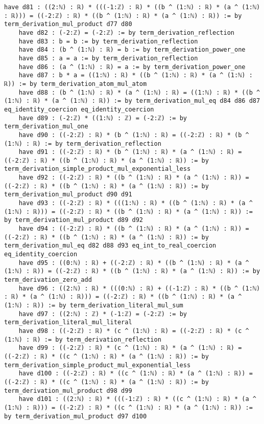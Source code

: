 \documentclass{article}
\begin{document}
\begin{tcolorbox}[colback=white!10, width=\linewidth]
\begin{lstlisting}[language=Lean4]
    have d81 : ((2:ℕ) : ℝ) * (((-1:ℤ) : ℝ) * ((b ^ (1:ℕ) : ℝ) * (a ^ (1:ℕ) : ℝ))) = ((-2:ℤ) : ℝ) * ((b ^ (1:ℕ) : ℝ) * (a ^ (1:ℕ) : ℝ)) := by term_derivation_mul_product d77 d80
    have d82 : (-2:ℤ) = (-2:ℤ) := by term_derivation_reflection
    have d83 : b = b := by term_derivation_reflection
    have d84 : (b ^ (1:ℕ) : ℝ) = b := by term_derivation_power_one
    have d85 : a = a := by term_derivation_reflection
    have d86 : (a ^ (1:ℕ) : ℝ) = a := by term_derivation_power_one
    have d87 : b * a = ((1:ℕ) : ℝ) * ((b ^ (1:ℕ) : ℝ) * (a ^ (1:ℕ) : ℝ)) := by term_derivation_atom_mul_atom
    have d88 : (b ^ (1:ℕ) : ℝ) * (a ^ (1:ℕ) : ℝ) = ((1:ℕ) : ℝ) * ((b ^ (1:ℕ) : ℝ) * (a ^ (1:ℕ) : ℝ)) := by term_derivation_mul_eq d84 d86 d87 eq_identity_coercion eq_identity_coercion
    have d89 : (-2:ℤ) * ((1:ℕ) : ℤ) = (-2:ℤ) := by term_derivation_mul_one
    have d90 : ((-2:ℤ) : ℝ) * (b ^ (1:ℕ) : ℝ) = ((-2:ℤ) : ℝ) * (b ^ (1:ℕ) : ℝ) := by term_derivation_reflection
    have d91 : ((-2:ℤ) : ℝ) * (b ^ (1:ℕ) : ℝ) * (a ^ (1:ℕ) : ℝ) = ((-2:ℤ) : ℝ) * ((b ^ (1:ℕ) : ℝ) * (a ^ (1:ℕ) : ℝ)) := by term_derivation_simple_product_mul_exponential_less
    have d92 : ((-2:ℤ) : ℝ) * ((b ^ (1:ℕ) : ℝ) * (a ^ (1:ℕ) : ℝ)) = ((-2:ℤ) : ℝ) * ((b ^ (1:ℕ) : ℝ) * (a ^ (1:ℕ) : ℝ)) := by term_derivation_mul_product d90 d91
    have d93 : ((-2:ℤ) : ℝ) * (((1:ℕ) : ℝ) * ((b ^ (1:ℕ) : ℝ) * (a ^ (1:ℕ) : ℝ))) = ((-2:ℤ) : ℝ) * ((b ^ (1:ℕ) : ℝ) * (a ^ (1:ℕ) : ℝ)) := by term_derivation_mul_product d89 d92
    have d94 : ((-2:ℤ) : ℝ) * ((b ^ (1:ℕ) : ℝ) * (a ^ (1:ℕ) : ℝ)) = ((-2:ℤ) : ℝ) * ((b ^ (1:ℕ) : ℝ) * (a ^ (1:ℕ) : ℝ)) := by term_derivation_mul_eq d82 d88 d93 eq_int_to_real_coercion eq_identity_coercion
    have d95 : ((0:ℕ) : ℝ) + ((-2:ℤ) : ℝ) * ((b ^ (1:ℕ) : ℝ) * (a ^ (1:ℕ) : ℝ)) = ((-2:ℤ) : ℝ) * ((b ^ (1:ℕ) : ℝ) * (a ^ (1:ℕ) : ℝ)) := by term_derivation_zero_add
    have d96 : ((2:ℕ) : ℝ) * (((0:ℕ) : ℝ) + ((-1:ℤ) : ℝ) * ((b ^ (1:ℕ) : ℝ) * (a ^ (1:ℕ) : ℝ))) = ((-2:ℤ) : ℝ) * ((b ^ (1:ℕ) : ℝ) * (a ^ (1:ℕ) : ℝ)) := by term_derivation_literal_mul_sum
    have d97 : ((2:ℕ) : ℤ) * (-1:ℤ) = (-2:ℤ) := by term_derivation_literal_mul_literal
    have d98 : ((-2:ℤ) : ℝ) * (c ^ (1:ℕ) : ℝ) = ((-2:ℤ) : ℝ) * (c ^ (1:ℕ) : ℝ) := by term_derivation_reflection
    have d99 : ((-2:ℤ) : ℝ) * (c ^ (1:ℕ) : ℝ) * (a ^ (1:ℕ) : ℝ) = ((-2:ℤ) : ℝ) * ((c ^ (1:ℕ) : ℝ) * (a ^ (1:ℕ) : ℝ)) := by term_derivation_simple_product_mul_exponential_less
    have d100 : ((-2:ℤ) : ℝ) * ((c ^ (1:ℕ) : ℝ) * (a ^ (1:ℕ) : ℝ)) = ((-2:ℤ) : ℝ) * ((c ^ (1:ℕ) : ℝ) * (a ^ (1:ℕ) : ℝ)) := by term_derivation_mul_product d98 d99
    have d101 : ((2:ℕ) : ℝ) * (((-1:ℤ) : ℝ) * ((c ^ (1:ℕ) : ℝ) * (a ^ (1:ℕ) : ℝ))) = ((-2:ℤ) : ℝ) * ((c ^ (1:ℕ) : ℝ) * (a ^ (1:ℕ) : ℝ)) := by term_derivation_mul_product d97 d100

\end{lstlisting}
\end{tcolorbox}
\end{document}
